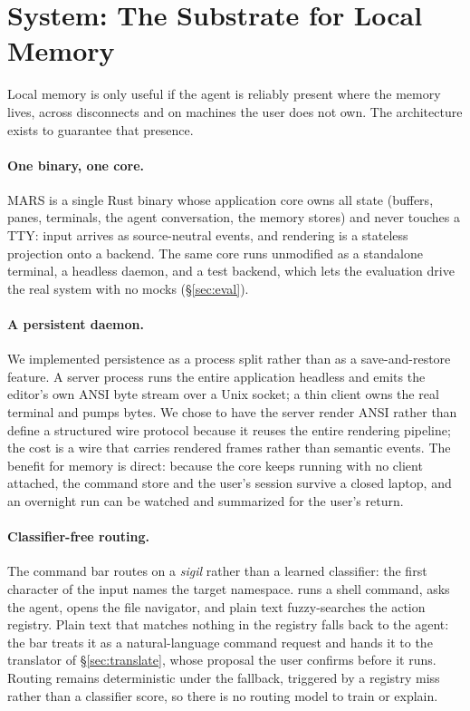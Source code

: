 \section{System: The Substrate for Local Memory}
\label{sec:system}

Local memory is only useful if the agent is reliably present where the memory lives,
across disconnects and on machines the user does not own. The architecture exists to
guarantee that presence.

\paragraph{One binary, one core.}
MARS is a single Rust binary whose application core owns all state (buffers, panes,
terminals, the agent conversation, the memory stores) and never touches a TTY:
input arrives as source-neutral events, and rendering is a stateless projection onto a
 backend. The same core runs unmodified as a standalone terminal, a
headless daemon, and a test backend, which lets the evaluation drive the real system
with no mocks (\S\ref{sec:eval}).

\paragraph{A persistent daemon.}
We implemented persistence as a process split rather than as a save-and-restore feature.
A server process runs the entire application headless and emits the editor's own ANSI
byte stream over a Unix socket; a thin client owns the real terminal and pumps bytes. We
chose to have the server render ANSI rather than define a structured wire protocol
because it reuses the entire rendering pipeline; the cost is a wire that carries
rendered frames rather than semantic events.
The benefit for memory is direct: because the core keeps running with no client attached,
the command store and the user's session survive a closed laptop, and an overnight run
can be watched and summarized for the user's return.

\paragraph{Classifier-free routing.}
The command bar routes on a \emph{sigil} rather than a learned classifier: the first
character of the input names the target namespace. \code{!} runs a shell command,
 asks the agent,  opens the file navigator, and plain text
fuzzy-searches the action registry. Plain text that matches nothing in the registry
falls back to the agent: the bar treats it as a natural-language command request and
hands it to the translator of \S\ref{sec:translate}, whose proposal the user confirms
before it runs. Routing remains deterministic under the fallback, triggered by a
registry miss rather than a classifier score, so there is no routing model to train or
explain.

